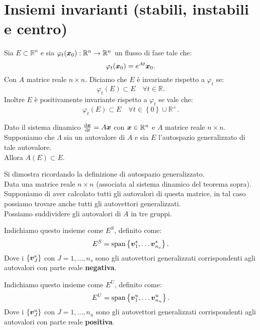 \section{Insiemi invarianti (stabili, instabili e centro)}%
\label{sec: Insiemi invarianti (stabili, instabili e centro)}%
\begin{defn}
    Sia $E \subset \mathbb{R}^n$ e sia $\varphi_t(\boldsymbol{x}_0): \mathbb{R}^n\to \mathbb{R}^n$ un flusso di fase tale che:
    \[
	\varphi_t(\boldsymbol{x}_0) = e^{At}\boldsymbol{x}_0
    .\] 
    Con $A$ matrice reale $n \times n$.
    Diciamo che $E$ è invariante rispetto a $\varphi_t$ se:
    \[
        \varphi_t(E) \subset E \quad \forall t \in \mathbb{R}
    .\] 
    Inoltre $E$ è positivamente invariante rispetto a $\varphi_t$ se vale che:
    \[
	\varphi_t(E) \subset E \quad  \forall t \in \left\{0\right\} \cup \mathbb{R}^+
    .\] 
\end{defn}
\noindent
\begin{thm}
Dato il sistema dinamico $\frac{\text{d} \boldsymbol{x}}{\text{d} t} = A\boldsymbol{x} $ con $\boldsymbol{x}\in \mathbb{R}^n$ e $A$ matrice reale $n \times n$. \\
Supponiamo che $\Lambda$ sia un autovalore di $A$ e sia $E$ l'autospazio generalizzato di tale autovalore.\\
Allora $A(E) \subset E$.
\end{thm}
\noindent
Si dimostra ricordando la definizione di autospazio generalizzato.\\
Data una matrice reale $n \times n$ (associata al sistema dinamico del teorema sopra). Supponiamo di aver calcolato tutti gli autovalori di questa matrice, in tal caso possiamo trovare anche tutti gli autovettori generalizzati. \\
Possiamo suddividere gli autovalori di $A$ in tre gruppi.
\begin{defn}
    Indichiamo questo insieme come $E^S$, definito come:
    \[
        E^S = \text{span}\left\{\boldsymbol{v}_1^s, \ldots \boldsymbol{v}_{n_s}^s\right\}
    .\] 
    Dove i $\left\{\boldsymbol{v}_J^s\right\}$ con $J = 1,\ldots, n_s$ sono gli autovettori generalizzati corrispondenti agli autovalori con parte reale \textbf{negativa}.
\end{defn}
\noindent
\begin{defn}
    Indichiamo questo insieme come $E^U$, definito come:
    \[
        E^U = \text{span}\left\{\boldsymbol{v}_1^u, \ldots \boldsymbol{v}_{n_u}^u\right\}
    .\] 
    Dove i $\left\{\boldsymbol{v}_J^u\right\}$ con $J = 1,\ldots, n_u$ sono gli autovettori generalizzati corrispondenti agli autovalori con parte reale \textbf{positiva}.
\end{defn}
